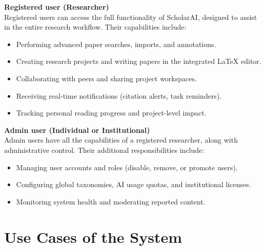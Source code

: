 \documentclass[11pt]{article}
\begin{document}
\vspace{1em}
\noindent\textbf{Registered user (Researcher)} \\
Registered users can access the full functionality of ScholarAI, designed to assist in the entire research workflow. Their capabilities include:
\begin{itemize}[noitemsep, leftmargin=*]
    \item Performing advanced paper searches, imports, and annotations.
    \item Creating research projects and writing papers in the integrated \LaTeX{} editor.
    \item Collaborating with peers and sharing project workspaces.
    \item Receiving real-time notifications (citation alerts, task reminders).
    \item Tracking personal reading progress and project-level impact.
\end{itemize}

\vspace{1em}
\noindent\textbf{Admin user (Individual or Institutional)} \\
Admin users have all the capabilities of a registered researcher, along with administrative control. Their additional responsibilities include:
\begin{itemize}[noitemsep, leftmargin=*]
    \item Managing user accounts and roles (disable, remove, or promote users).
    \item Configuring global taxonomies, AI usage quotas, and institutional licenses.
    \item Monitoring system health and moderating reported content.
\end{itemize}




\vspace{1.2em}
\section*{Use Cases of the System}
\end{document}
